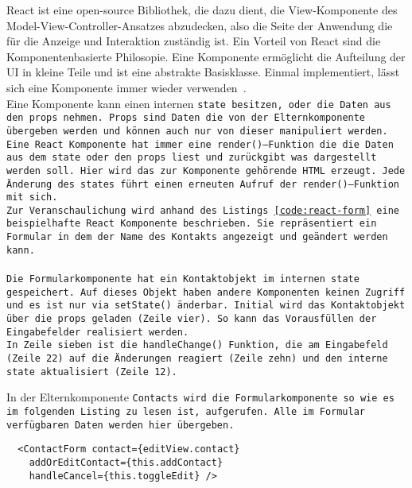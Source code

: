React ist eine open-source Bibliothek, die dazu dient, die View-Komponente des Model-View-Controller-Ansatzes abzudecken, also die Seite der Anwendung die für die Anzeige und Interaktion zuständig ist. Ein Vorteil von React sind die Komponentenbasierte Philosopie. Eine Komponente ermöglicht die Aufteilung der \gls{UI} in kleine Teile und ist eine abstrakte Basisklasse. Einmal implementiert, lässt sich eine Komponente immer wieder verwenden~\cite{react}.\\
Eine Komponente kann einen internen \tt{state} besitzen, oder die Daten aus den \tt{props} nehmen.
\tt{Props} sind Daten die von der Elternkomponente übergeben werden und können auch nur von dieser manipuliert werden.
Eine React Komponente hat immer eine \tt{render()}--Funktion die die Daten aus dem \tt{state} oder den \tt{props} liest und zurückgibt was dargestellt werden soll.
Hier wird das zur Komponente gehörende \gls{HTML} erzeugt. Jede Änderung des \tt{states} führt einen erneuten Aufruf der \tt{render()}--Funktion mit sich.\\
Zur Veranschaulichung wird anhand des Listings \ref{code:react-form} eine beispielhafte React Komponente beschrieben.
Sie repräsentiert ein Formular in dem der Name des Kontakts angezeigt und geändert werden kann.\\\\
Die Formularkomponente hat ein Kontaktobjekt im internen \tt{state} gespeichert. Auf dieses Objekt haben andere Komponenten keinen Zugriff und es ist nur via \tt{setState()} änderbar.
Initial wird das Kontaktobjekt über die \tt{props} geladen (Zeile vier). So kann das Vorausfüllen der Eingabefelder realisiert werden.\\
In Zeile sieben ist die \tt{handleChange()} Funktion, die am Eingabefeld (Zeile 22) auf die Änderungen reagiert (Zeile zehn) und den interne \tt{state} aktualisiert (Zeile 12).
\begin{center}
  
\end{center}
%
In der Elternkomponente \tt{Contacts} wird die Formularkomponente so wie es im folgenden Listing zu lesen ist, aufgerufen.
Alle im Formular verfügbaren Daten werden hier übergeben.
\begin{lstlisting}
  <ContactForm contact={editView.contact}
    addOrEditContact={this.addContact}
    handleCancel={this.toggleEdit} />
\end{lstlisting}
